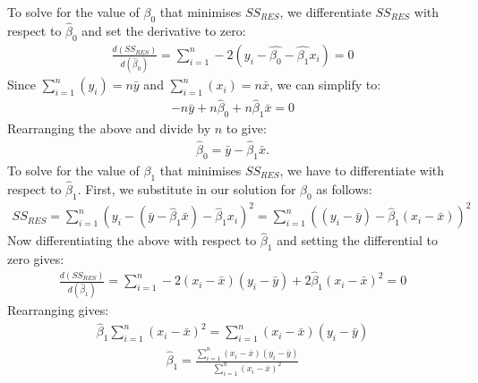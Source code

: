 \documentclass[letterpaper,10pt,english]{jupyterBook}
\begin{document}
\sphinxAtStartPar
To solve for the value of \(\beta_0\) that minimises \(SS_{RES}\), we differentiate \(SS_{RES}\) with respect to \(\hat{\beta}_0\) and set the derivative to zero:
\begin{equation*}
\begin{split} 
\frac{d(SS_{RES})}{d(\hat{\beta}_0)} = \sum_{i=1}^n -2(y_i-\hat{\beta_0}-\hat{\beta_1}x_i)=0
\end{split}
\end{equation*}
\sphinxAtStartPar
Since \(\sum_{i=1}^n (y_i)=n\bar{y}\) and \(\sum_{i=1}^n(x_i)=n\bar{x}\), we can simplify to:
\begin{equation*}
\begin{split}
-n\bar{y}+n\hat{\beta}_0+n\hat{\beta}_1\bar{x}=0
\end{split}
\end{equation*}
\sphinxAtStartPar
Rearranging the above and divide by \(n\) to give:
\begin{equation*}
\begin{split}
\hat{\beta}_0=\bar{y}-\hat{\beta}_1\bar{x}.
\end{split}
\end{equation*}
\sphinxAtStartPar
To solve for the value of \(\beta_1\) that minimises \(SS_{RES}\), we have to differentiate with respect to \(\hat{\beta}_1\). First, we substitute in our solution for \(\hat{\beta}_0\) as follows:
\begin{equation*}
\begin{split}
SS_{RES}=\sum_{i=1}^n(y_i-(\bar{y}-\hat{\beta}_1\bar{x})-\hat{\beta}_1x_i)^2=\sum_{i=1}^n ((y_i-\bar{y})-\hat{\beta}_1(x_i-\bar{x}))^2
\end{split}
\end{equation*}
\sphinxAtStartPar
Now differentiating the above with respect to \(\hat{\beta}_1\) and setting the differential to zero gives:
\begin{equation*}
\begin{split}
\frac{d(SS_{RES})}{d(\hat{\beta}_1)} = \sum_{i=1}^n -2(x_i-\bar{x})(y_i-\bar{y})+2\hat{\beta}_1(x_i-\bar{x})^2=0
\end{split}
\end{equation*}
\sphinxAtStartPar
Rearranging gives:
\begin{equation*}
\begin{split}
\hat{\beta}_1\sum_{i=1}^n (x_i-\bar{x})^2 = \sum_{i=1}^n (x_i-\bar{x})(y_i-\bar{y})
\end{split}
\end{equation*}\begin{equation*}
\begin{split}
\hat{\beta}_1 = \frac{\sum_{i=1}^n (x_i-\bar{x})(y_i-\bar{y})}{\sum_{i=1}^n(x_i-\bar{x})^2}
\end{split}
\end{equation*}
\end{document}
